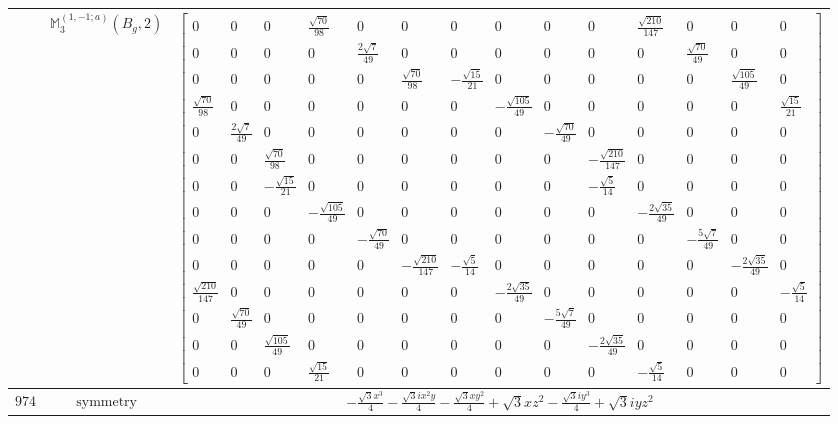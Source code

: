 \documentclass[fleqn,8pt,landscape]{jsarticle}
\begin{document}
\begin{longtable}{ccc}
$  $ & $ \mathbb{M}_{3}^{(1,-1;a)}(B_{g},2) $ & $ \begin{bmatrix} 0 & 0 & 0 & \frac{\sqrt{70}}{98} & 0 & 0 & 0 & 0 & 0 & 0 & \frac{\sqrt{210}}{147} & 0 & 0 & 0 \\ 0 & 0 & 0 & 0 & \frac{2 \sqrt{7}}{49} & 0 & 0 & 0 & 0 & 0 & 0 & \frac{\sqrt{70}}{49} & 0 & 0 \\ 0 & 0 & 0 & 0 & 0 & \frac{\sqrt{70}}{98} & - \frac{\sqrt{15}}{21} & 0 & 0 & 0 & 0 & 0 & \frac{\sqrt{105}}{49} & 0 \\ \frac{\sqrt{70}}{98} & 0 & 0 & 0 & 0 & 0 & 0 & - \frac{\sqrt{105}}{49} & 0 & 0 & 0 & 0 & 0 & \frac{\sqrt{15}}{21} \\ 0 & \frac{2 \sqrt{7}}{49} & 0 & 0 & 0 & 0 & 0 & 0 & - \frac{\sqrt{70}}{49} & 0 & 0 & 0 & 0 & 0 \\ 0 & 0 & \frac{\sqrt{70}}{98} & 0 & 0 & 0 & 0 & 0 & 0 & - \frac{\sqrt{210}}{147} & 0 & 0 & 0 & 0 \\ 0 & 0 & - \frac{\sqrt{15}}{21} & 0 & 0 & 0 & 0 & 0 & 0 & - \frac{\sqrt{5}}{14} & 0 & 0 & 0 & 0 \\ 0 & 0 & 0 & - \frac{\sqrt{105}}{49} & 0 & 0 & 0 & 0 & 0 & 0 & - \frac{2 \sqrt{35}}{49} & 0 & 0 & 0 \\ 0 & 0 & 0 & 0 & - \frac{\sqrt{70}}{49} & 0 & 0 & 0 & 0 & 0 & 0 & - \frac{5 \sqrt{7}}{49} & 0 & 0 \\ 0 & 0 & 0 & 0 & 0 & - \frac{\sqrt{210}}{147} & - \frac{\sqrt{5}}{14} & 0 & 0 & 0 & 0 & 0 & - \frac{2 \sqrt{35}}{49} & 0 \\ \frac{\sqrt{210}}{147} & 0 & 0 & 0 & 0 & 0 & 0 & - \frac{2 \sqrt{35}}{49} & 0 & 0 & 0 & 0 & 0 & - \frac{\sqrt{5}}{14} \\ 0 & \frac{\sqrt{70}}{49} & 0 & 0 & 0 & 0 & 0 & 0 & - \frac{5 \sqrt{7}}{49} & 0 & 0 & 0 & 0 & 0 \\ 0 & 0 & \frac{\sqrt{105}}{49} & 0 & 0 & 0 & 0 & 0 & 0 & - \frac{2 \sqrt{35}}{49} & 0 & 0 & 0 & 0 \\ 0 & 0 & 0 & \frac{\sqrt{15}}{21} & 0 & 0 & 0 & 0 & 0 & 0 & - \frac{\sqrt{5}}{14} & 0 & 0 & 0 \end{bmatrix} $ \\ \hline
$ 974 $ & $ \text{symmetry} $ & $ - \frac{\sqrt{3} x^{3}}{4} - \frac{\sqrt{3} i x^{2} y}{4} - \frac{\sqrt{3} x y^{2}}{4} + \sqrt{3} x z^{2} - \frac{\sqrt{3} i y^{3}}{4} + \sqrt{3} i y z^{2} $ \\

\end{longtable}
\end{document}
